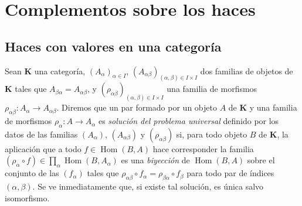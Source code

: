 \section{Complementos sobre los haces}
\label{section:0.3-fr}

\subsection{Haces con valores en una categoría}
\label{subsection:0.3.1-fr}

\begin{env}[3.1.1]
\label{0.3.1.1-fr}
Sean $\boldsymbol{K}$ una categoría, $(A_\alpha)_{\alpha\in I}$,
$(A_{\alpha\beta})_{(\alpha,\beta)\in I\times I}$ dos familias de objetos de
$\boldsymbol{K}$ tales que $A_{\beta\alpha}=A_{\alpha\beta}$, y
$(\rho_{\alpha\beta})_{(\alpha,\beta)\in I\times I}$ una familia de morfismos
$\rho_{\alpha\beta}:A_\alpha\to A_{\alpha\beta}$. Diremos que un par
formado por un objeto $A$ de $\boldsymbol{K}$ y una familia de morfismos
$\rho_\alpha:A\to A_\alpha$ es \emph{solución del problema universal} definido
por los datos de las familias $(A_\alpha)$, $(A_{\alpha\beta})$ y
$(\rho_{\alpha\beta})$ si, para todo objeto $B$ de $\boldsymbol{K}$, la aplicación
que a todo $f\in\operatorname{Hom}(B,A)$ hace corresponder la familia
$(\rho_\alpha\circ f)\in\prod_\alpha\operatorname{Hom}(B,A_\alpha)$ es una
\emph{biyección} de $\operatorname{Hom}(B,A)$ sobre el conjunto de las $(f_\alpha)$
tales que
$\rho_{\alpha\beta}\circ f_\alpha=\rho_{\beta\alpha}\circ f_\beta$ para todo
par de índices $(\alpha,\beta)$. Se ve inmediatamente que, si existe tal
solución, es única salvo isomorfismo.
\end{env}

